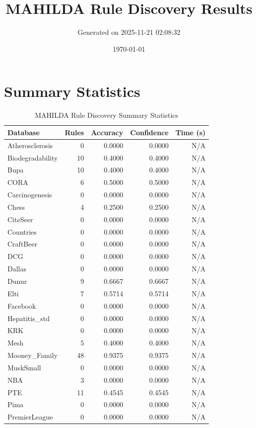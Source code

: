 \documentclass[11pt,a4paper]{article}
\title{MAHILDA Rule Discovery Results}
\author{Generated on 2025-11-21 02:08:32}
\date{\today}
\begin{document}
\maketitle

\section{Summary Statistics}
\begin{table}[h!]
\centering
\caption{MAHILDA Rule Discovery Summary Statistics}
\label{tab:mahilda_summary}
\begin{tabular}{|l|r|r|r|r|}
\hline
\textbf{Database} & \textbf{Rules} & \textbf{Accuracy} & \textbf{Confidence} & \textbf{Time (s)} \\
\hline
Atherosclerosis & 0 & 0.0000 & 0.0000 & N/A \\
Biodegradability & 10 & 0.4000 & 0.4000 & N/A \\
Bupa & 10 & 0.4000 & 0.4000 & N/A \\
CORA & 6 & 0.5000 & 0.5000 & N/A \\
Carcinogenesis & 0 & 0.0000 & 0.0000 & N/A \\
Chess & 4 & 0.2500 & 0.2500 & N/A \\
CiteSeer & 0 & 0.0000 & 0.0000 & N/A \\
Countries & 0 & 0.0000 & 0.0000 & N/A \\
CraftBeer & 0 & 0.0000 & 0.0000 & N/A \\
DCG & 0 & 0.0000 & 0.0000 & N/A \\
Dallas & 0 & 0.0000 & 0.0000 & N/A \\
Dunur & 9 & 0.6667 & 0.6667 & N/A \\
Elti & 7 & 0.5714 & 0.5714 & N/A \\
Facebook & 0 & 0.0000 & 0.0000 & N/A \\
Hepatitis_std & 0 & 0.0000 & 0.0000 & N/A \\
KRK & 0 & 0.0000 & 0.0000 & N/A \\
Mesh & 5 & 0.4000 & 0.4000 & N/A \\
Mooney_Family & 48 & 0.9375 & 0.9375 & N/A \\
MuskSmall & 0 & 0.0000 & 0.0000 & N/A \\
NBA & 3 & 0.0000 & 0.0000 & N/A \\
PTE & 11 & 0.4545 & 0.4545 & N/A \\
Pima & 0 & 0.0000 & 0.0000 & N/A \\
PremierLeague & 0 & 0.0000 & 0.0000 & N/A \\

\end{tabular}
\end{table}
\end{document}
